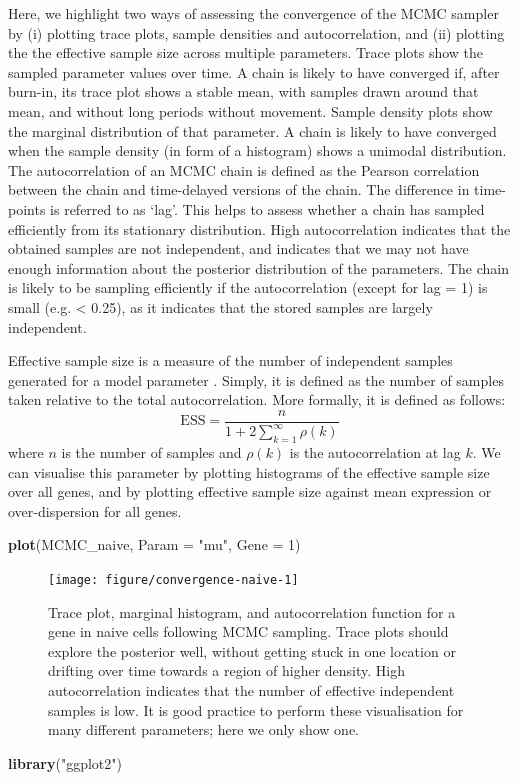\documentclass[9pt,a4paper,]{extarticle}
\newenvironment{Shaded}{\begin{snugshade}}{\end{snugshade}}
\newcommand{\DataTypeTok}[1]{\textcolor[rgb]{0.13,0.29,0.53}{#1}}
\newcommand{\DecValTok}[1]{\textcolor[rgb]{0.00,0.00,0.81}{#1}}
\newcommand{\KeywordTok}[1]{\textcolor[rgb]{0.13,0.29,0.53}{\textbf{#1}}}
\newcommand{\NormalTok}[1]{#1}
\newcommand{\StringTok}[1]{\textcolor[rgb]{0.31,0.60,0.02}{#1}}
\begin{document}
Here, we highlight two ways of assessing the convergence of the MCMC sampler by
(i) plotting trace plots, sample densities and autocorrelation, and
(ii) plotting the the effective sample size across multiple parameters.
Trace plots show the sampled parameter values over time.
A chain is likely to have converged if, after burn-in, its trace plot
shows a stable mean, with samples drawn around that mean, and without
long periods without movement. Sample density plots
show the marginal distribution of that parameter. A chain is likely to
have converged when the sample density (in form of a histogram) shows a unimodal
distribution. The autocorrelation of an MCMC chain is defined as the Pearson
correlation between the chain and time-delayed versions of the chain.
The difference in time-points is referred to as `lag'. This helps to assess
whether a chain has sampled efficiently from its stationary distribution.
High autocorrelation indicates that the obtained samples are not independent,
and indicates that we may not have enough information about the posterior
distribution of the parameters. The chain is likely to be sampling efficiently
if the autocorrelation (except for lag = 1) is small (e.g. \textless{} 0.25), as it
indicates that the stored samples are largely independent.

Effective sample size is a measure of the number of independent samples
generated for a model parameter \citep{Gelman2014}. Simply, it is defined as the
number of samples taken relative to the total autocorrelation.
More formally, it is defined as follows:
\[
  \mbox{ESS} = \frac{n}{1 + 2\sum_{k=1}^\infty \rho(k)}
\]
where \(n\) is the number of samples and \(\rho(k)\) is the autocorrelation at lag
\(k\). We can visualise this parameter by plotting histograms of the effective
sample size over all genes, and by plotting effective sample size against
mean expression or over-dispersion for all genes.

\begin{Shaded}
\begin{Highlighting}[]
\KeywordTok{plot}\NormalTok{(MCMC_naive, }\DataTypeTok{Param =} \StringTok{"mu"}\NormalTok{, }\DataTypeTok{Gene =} \DecValTok{1}\NormalTok{)}
\end{Highlighting}
\end{Shaded}

\begin{figure}

{\centering \texttt{[image: figure/convergence-naive-1]} 

}

\caption{Trace plot, marginal histogram, and autocorrelation function for a gene in naive cells following MCMC sampling. Trace plots should explore the posterior well, without getting stuck in one location or drifting over time towards a region of higher density. High autocorrelation indicates that the number of effective independent samples is low. It is good practice to perform these visualisation for many different parameters; here we only show one.}\label{fig:convergence-naive}
\end{figure}

\begin{Shaded}
\begin{Highlighting}[]
\KeywordTok{library}\NormalTok{(}\StringTok{"ggplot2"}\NormalTok{)}
\end{Highlighting}
\end{Shaded}

{\small}
\end{document}
